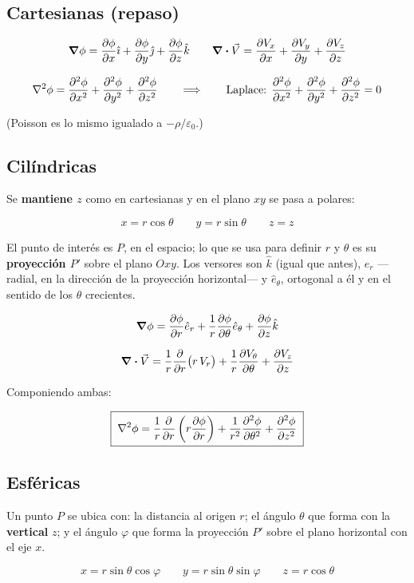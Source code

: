 \documentclass[12pt,a4paper]{article}
\begin{document}
\subsection{Cartesianas (repaso)}

\[
\grad\phi = \pdv{\phi}{x}\hat\imath + \pdv{\phi}{y}\hat\jmath + \pdv{\phi}{z}\hat k
\qquad
\div\vec V = \pdv{V_x}{x} + \pdv{V_y}{y} + \pdv{V_z}{z}
\]

\[
\laplacian\phi = \pdv[2]{\phi}{x} + \pdv[2]{\phi}{y} + \pdv[2]{\phi}{z}
\qquad\Longrightarrow\qquad
\text{Laplace: } \pdv[2]{\phi}{x} + \pdv[2]{\phi}{y} + \pdv[2]{\phi}{z} = 0
\]

(Poisson es lo mismo igualado a $-\rho/\varepsilon_0$.)

\subsection{Cilíndricas}

Se \textbf{mantiene $z$} como en cartesianas y en el plano $xy$ se pasa a
polares:

\[
x = r\cos\theta \qquad y = r\sin\theta \qquad z = z
\]

El punto de interés es $P$, en el espacio; lo que se usa para definir $r$ y
$\theta$ es su \textbf{proyección $P'$} sobre el plano $Oxy$. Los versores son
$\hat k$ (igual que antes), $\hat e_r$ ---radial, en la dirección de la
proyección horizontal--- y $\hat e_\theta$, ortogonal a él y en el sentido de los
$\theta$ crecientes.

\[
\grad\phi = \pdv{\phi}{r}\hat e_r + \frac{1}{r}\pdv{\phi}{\theta}\hat e_\theta
+ \pdv{\phi}{z}\hat k
\]

\[
\div\vec V = \frac{1}{r}\pdv{r}\big(r\,V_r\big) + \frac{1}{r}\pdv{V_\theta}{\theta}
+ \pdv{V_z}{z}
\]

Componiendo ambas:

\[
\boxed{\;\laplacian\phi = \frac{1}{r}\pdv{r}\left(r\pdv{\phi}{r}\right)
+ \frac{1}{r^2}\pdv[2]{\phi}{\theta} + \pdv[2]{\phi}{z}\;}
\]

\subsection{Esféricas}

Un punto $P$ se ubica con: la distancia al origen $r$; el ángulo $\theta$ que
forma con la \textbf{vertical} $z$; y el ángulo $\varphi$ que forma la proyección
$P'$ sobre el plano horizontal con el eje $x$.

\[
x = r\sin\theta\cos\varphi \qquad y = r\sin\theta\sin\varphi \qquad z = r\cos\theta
\]
\end{document}
